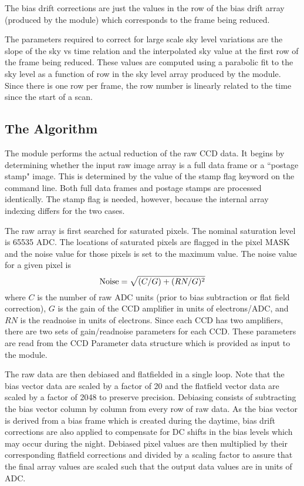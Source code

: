 The bias drift corrections are just the values in the row of the
bias drift array (produced by the \cff module) which corresponds to
the frame being reduced.

The parameters required to correct for large scale sky level
variations are the slope of the sky vs time relation 
and the interpolated sky value at the first row of the
frame being reduced. These values are computed using a parabolic
fit to the sky level as a function of row in the sky level
array produced by the \cff module. Since there is one row per
frame, the row number is linearly related to the time since the
start of a scan. 

\subsection{The \cfrm Algorithm}

The \cfrm module performs the actual reduction of the raw
CCD data. It begins by determining whether the
input raw image array is a full data frame or a ``postage
stamp" image. This is determined by the value of the
stamp flag keyword on the command line. Both full data frames
and postage stamps are processed identically. 
The stamp flag is needed, however, because the internal array indexing 
differs for the two cases.

The raw array is first searched for saturated pixels. 
The nominal saturation level is 65535 ADC. The locations of saturated
pixels are flagged in the pixel MASK and the noise value for those
pixels is set to the maximum value. The noise value for a given pixel
is 
$$ \hbox{Noise} = \sqrt{(C/G) + (RN/G)^2} $$
where $C$ is the number of raw ADC units (prior to bias subtraction or
flat field correction), $G$ is the gain
of the CCD amplifier in units of electrons/ADC, and $RN$ is
the readnoise in units of electrons. Since each CCD has
two amplifiers, there are two sets of gain/readnoise parameters
for each CCD. These parameters are read from the CCD Parameter
data structure which is provided as input to the \cfrm module.

The raw data are then debiased and flatfielded in a single loop.
Note that the bias vector data are scaled by a factor of 20
and the flatfield vector data are scaled by a factor of 2048
to preserve precision. 
Debiasing consists of subtracting the bias vector column by
column from every row of raw data. As the bias vector is derived
from a bias frame which is created during the daytime, bias drift
corrections are also applied to compensate for DC shifts in the
bias levels which may occur during the night. 
Debiased pixel values are then multiplied by their corresponding
flatfield corrections and divided by a scaling factor to assure
that the final array values are scaled such that the output data values
are in units of ADC.
 
